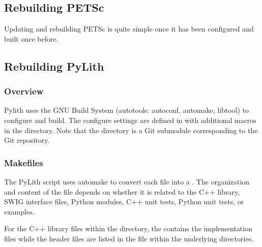 \subsection{Rebuilding PETSc}

Updating and rebuilding PETSc is quite simple once it has been configured and built once before.


\subsection{Rebuilding PyLith}

\subsubsection{Overview}

Pylith uses the GNU Build System (autotools: autoconf, automake,
libtool) to configure and build. The configure settings are defined in
 with additional macros in the 
directory. Note that the  directory is a Git submodule
corresponding to the  Git repository.

\subsubsection{Makefiles}

The PyLith  script uses automake to convert each
 file into a . The
organization and content of the  file depends on
whether it is related to the C++ library, SWIG interface files, Python
modules, C++ unit tests, Python unit tests, or examples.

For the C++ library files within the  directory, the
 contains the implementation files while
the header files are listed in the  file within
the underlying directories.

